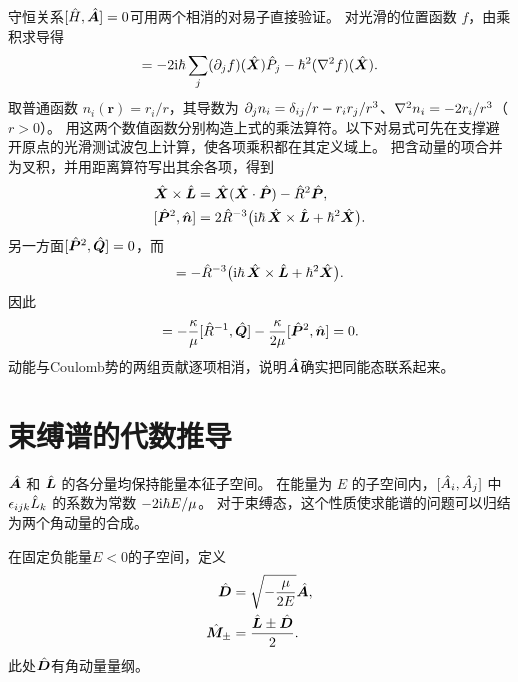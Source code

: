 \label{ss:rl-conservation}
守恒关系$[\hat{H},\hat{\bm{A}}] = 0$可用两个相消的对易子直接验证。
对光滑的位置函数 $f$，由乘积求导得
\begin{equation}
    [\opbm{P}^2,f(\opbm{X})]
    = -2\i\hbar\sum_j(\p_j f)(\opbm X)\op{P}_j - \hbar^2(\laplacian f)(\opbm X).
\end{equation}
取普通函数 $n_i(\bm r) = r_i/r$，其导数为
$\partial_j n_i = \delta_{ij}/r - r_i r_j/r^3$、$\nabla^2 n_i = -2r_i/r^3$（$r > 0$）。
用这两个数值函数分别构造上式的乘法算符。以下对易式可先在支撑避开原点的光滑测试波包上计算，使各项乘积都在其定义域上。
把含动量的项合并为叉积，并用距离算符写出其余各项，得到
\begin{equation}
    \begin{alignedat}{1}
        \opbm{X} \times \opbm{L}
            &= \opbm{X}(\opbm{X} \cdot \opbm{P}) - \op{R}^2\opbm{P},\\
        [\opbm{P}^2,\opbm{n}]
            &= 2\op R^{-3}\bigp{\i\hbar\,\opbm{X} \times \opbm{L} + \hbar^2\opbm{X}}.
    \end{alignedat}
\end{equation}
另一方面$[\hat{\bm{P}}^2,\hat{\bm{Q}}] = 0$，而
\begin{equation}
    [\op{R}^{-1},\opbm{Q}]
    = -\op R^{-3}\bigp{\i\hbar\,\opbm{X} \times \opbm{L} + \hbar^2\opbm{X}}.
\end{equation}
因此
\begin{equation}
    [\op{H},\opbm{A}] = -\frac{\kappa}{\mu}[\op{R}^{-1},\opbm{Q}]
            - \frac{\kappa}{2\mu}[\opbm{P}^2,\opbm{n}] = 0.
\end{equation}
动能与Coulomb势的两组贡献逐项相消，说明$\hat{\bm{A}}$确实把同能态联系起来。

\section{束缚谱的代数推导}
$\hat{\bm{A}}$ 和 $\hat{\bm{L}}$ 的各分量均保持能量本征子空间。
在能量为 $E$ 的子空间内，$[\hat{A}_i,\hat{A}_j]$ 中 $\epsilon_{ijk}\hat{L}_k$ 的系数为常数 $-2\mathrm{i}\hbar E/\mu$。
对于束缚态，这个性质使求能谱的问题可以归结为两个角动量的合成。

在固定负能量$E < 0$的子空间，定义
\begin{subequations}
    \begin{align}
        \hat{\bm{D}} &= \sqrt{-\frac\mu{2E}}\hat{\bm{A}},\\
        \hat{\bm{M}}_\pm &= \frac{\hat{\bm{L}} \pm \hat{\bm{D}}}{2}.
    \end{align}
\end{subequations}
此处$\hat{\bm{D}}$有角动量量纲。

